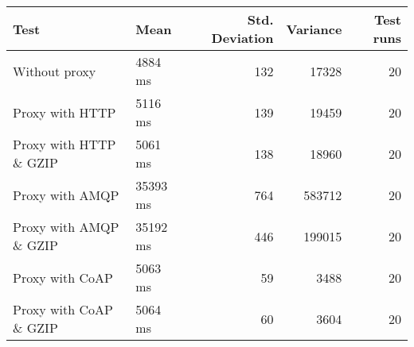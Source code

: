 \begin{tabular}{llrrr}
\hline
 Test                   & Mean     &   Std. Deviation &   Variance &   Test runs \\
\hline
 Without proxy          & 4884 ms  &              132 &      17328 &          20 \\
 Proxy with HTTP        & 5116 ms  &              139 &      19459 &          20 \\
 Proxy with HTTP \& GZIP & 5061 ms  &              138 &      18960 &          20 \\
 Proxy with AMQP        & 35393 ms &              764 &     583712 &          20 \\
 Proxy with AMQP \& GZIP & 35192 ms &              446 &     199015 &          20 \\
 Proxy with CoAP        & 5063 ms  &               59 &       3488 &          20 \\
 Proxy with CoAP \& GZIP & 5064 ms  &               60 &       3604 &          20 \\
\hline
\end{tabular}